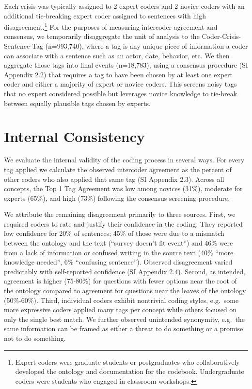 \documentclass{article}
\begin{document}
Each crisis was typically assigned to 2 expert coders and 2 novice
coders with an additional tie-breaking expert coder assigned to
sentences with high disagreement.\footnote{Expert coders were graduate
  students or postgraduates who collaboratively developed the ontology
  and documentation for the codebook. Undergraduate coders were students
  who engaged in classroom workshops.} For the purposes of measuring
intercoder agreement and consensus, we temporarily disaggregate the unit
of analysis to the Coder-Crisis-Sentence-Tag (n=993,740), where a tag is
any unique piece of information a coder can associate with a sentence
such as an actor, date, behavior, etc. We then aggregate those tags into
final events (n=18,783), using a consensus procedure (SI Appendix 2.2)
that requires a tag to have been chosen by at least one expert coder and
either a majority of expert or novice coders. This screens noisy tags
that no expert considered possible but leverages novice knowledge to
tie-break between equally plausible tags chosen by experts.

\hypertarget{internal-consistency}{%
\section{Internal Consistency}\label{internal-consistency}}

We evaluate the internal validity of the coding process in several ways.
For every tag applied we calculate the observed intercoder agreement as
the percent of other coders who also applied that same tag (SI Appendix
2.3). Across all concepts, the Top 1 Tag Agreement was low among novices
(31\%), moderate for experts (65\%), and high (73\%) following the
consensus screening procedure.

We attribute the remaining disagreement primarily to three sources.
First, we required coders to rate and justify their confidence in the
coding. They reported low confidence for 20\% of sentences; 45\% of
those were due to a mismatch between the ontology and the text (``survey
doesn't fit event'') and 46\% were from a lack of information or
confused writing in the source text (40\% ``more knowledge needed'', 6\%
``confusing sentence''). Observed disagreement varied predictably with
self-reported confidence (SI Appendix 2.4). Second, as intended,
agreement is higher (75-80\%) for questions with fewer options near the
root of the ontology compared to agreement for questions near the leaves
of the ontology (50\%-60\%). Third, individual coders exhibit nontrivial
coding styles, e.g.~some more expressive coders applied many tags per
concept while others focused on only the single best match. We further
observed unintended synonymity, e.g.~the same information can be framed
as either a threat to do something or a promise not to do something.
\end{document}
